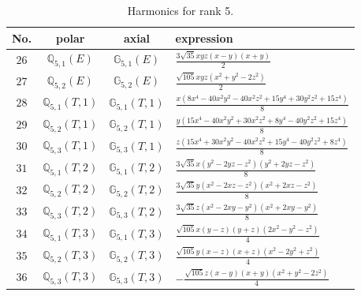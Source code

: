 \documentclass[fleqn,8pt,landscape]{jsarticle}
\begin{document}
\begin{table}[ht!]
\begin{center}
\caption{Harmonics for rank 5.}
\renewcommand{\arraystretch}{1.3}
\begin{tabular}{cccl} \hline \hline
No. & polar & axial & expression \\ \hline
$ 26 $ & $ \mathbb{Q}_{5,1}(E) $ & $ \mathbb{G}_{5,1}(E) $ & $ \frac{3 \sqrt{35} x y z \left(x - y\right) \left(x + y\right)}{2} $ \\
$ 27 $ & $ \mathbb{Q}_{5,2}(E) $ & $ \mathbb{G}_{5,2}(E) $ & $ \frac{\sqrt{105} x y z \left(x^{2} + y^{2} - 2 z^{2}\right)}{2} $ \\
$ 28 $ & $ \mathbb{Q}_{5,1}(T,1) $ & $ \mathbb{G}_{5,1}(T,1) $ & $ \frac{x \left(8 x^{4} - 40 x^{2} y^{2} - 40 x^{2} z^{2} + 15 y^{4} + 30 y^{2} z^{2} + 15 z^{4}\right)}{8} $ \\
$ 29 $ & $ \mathbb{Q}_{5,2}(T,1) $ & $ \mathbb{G}_{5,2}(T,1) $ & $ \frac{y \left(15 x^{4} - 40 x^{2} y^{2} + 30 x^{2} z^{2} + 8 y^{4} - 40 y^{2} z^{2} + 15 z^{4}\right)}{8} $ \\
$ 30 $ & $ \mathbb{Q}_{5,3}(T,1) $ & $ \mathbb{G}_{5,3}(T,1) $ & $ \frac{z \left(15 x^{4} + 30 x^{2} y^{2} - 40 x^{2} z^{2} + 15 y^{4} - 40 y^{2} z^{2} + 8 z^{4}\right)}{8} $ \\
$ 31 $ & $ \mathbb{Q}_{5,1}(T,2) $ & $ \mathbb{G}_{5,1}(T,2) $ & $ \frac{3 \sqrt{35} x \left(y^{2} - 2 y z - z^{2}\right) \left(y^{2} + 2 y z - z^{2}\right)}{8} $ \\
$ 32 $ & $ \mathbb{Q}_{5,2}(T,2) $ & $ \mathbb{G}_{5,2}(T,2) $ & $ \frac{3 \sqrt{35} y \left(x^{2} - 2 x z - z^{2}\right) \left(x^{2} + 2 x z - z^{2}\right)}{8} $ \\
$ 33 $ & $ \mathbb{Q}_{5,3}(T,2) $ & $ \mathbb{G}_{5,3}(T,2) $ & $ \frac{3 \sqrt{35} z \left(x^{2} - 2 x y - y^{2}\right) \left(x^{2} + 2 x y - y^{2}\right)}{8} $ \\
$ 34 $ & $ \mathbb{Q}_{5,1}(T,3) $ & $ \mathbb{G}_{5,1}(T,3) $ & $ \frac{\sqrt{105} x \left(y - z\right) \left(y + z\right) \left(2 x^{2} - y^{2} - z^{2}\right)}{4} $ \\
$ 35 $ & $ \mathbb{Q}_{5,2}(T,3) $ & $ \mathbb{G}_{5,2}(T,3) $ & $ \frac{\sqrt{105} y \left(x - z\right) \left(x + z\right) \left(x^{2} - 2 y^{2} + z^{2}\right)}{4} $ \\
$ 36 $ & $ \mathbb{Q}_{5,3}(T,3) $ & $ \mathbb{G}_{5,3}(T,3) $ & $ - \frac{\sqrt{105} z \left(x - y\right) \left(x + y\right) \left(x^{2} + y^{2} - 2 z^{2}\right)}{4} $ \\
 \hline \hline
\end{tabular}
\end{center}
\end{table}
\end{document}
